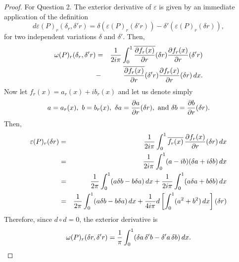 \begin{proof}
  For Question 2. The exterior derivative of
  $\varepsilon$ is given by an immediate application of the definition
  $$
    d\varepsilon(P)_r(\delta_r,\delta'r) = \delta(\varepsilon(P)_r(\delta'r)) - \delta'(\varepsilon(P)_r(\delta r)),
    $$
  for two independent variations $\delta$ and $\delta'$. Then,
  \begin{eqnarray*}
    \omega(P)_r(\delta_r,\delta'r) &= &{1 \over 2i\pi} \int_0^1 \overline{\partial f_r(x) \over \partial r}(\delta r)
    {\partial f_r(x) \over \partial r}(\delta' r) \\
    & - & \overline{\partial f_r(x) \over \partial r}(\delta' r)
    {\partial f_r(x) \over \partial r}(\delta r) \, dx.
  \end{eqnarray*}
  Now let $f_r(x) = a_r(x) + ib_r(x)$ and let us denote
  simply
  $$
    a = a_r(x),\ b = b_r(x),\ \delta a = {\partial a \over \partial r}(\delta r),\
    \mbox{and}\ \delta b = {\partial b \over \partial r}(\delta r).
    $$
  Then,
  \begin{eqnarray*}
    \varepsilon(P)_r(\delta r) & = & {1 \over 2i\pi} \int_0^1
    \overline{f_r(x)} \, {\partial f_r(x) \over \partial r}(\delta r) \, dx \\
    &=& {1 \over 2i\pi} \int_0^1
    (a -ib) (\delta a + i \delta b) \, dx \\
    &=& {1 \over 2\pi} \int_0^1 (a \delta b - b \delta a) \, dx + {1 \over 2i\pi} \int_0^1 (a \delta a + b \delta b) \, dx \\
    &=& {1 \over 2\pi} \int_0^1 (a \delta b - b \delta a) \, dx + {1 \over 4i\pi} d\left[\int_0^1 (a^2 + b^2) \, dx\right](\delta r)
  \end{eqnarray*}
  Therefore, since $d\circ d = 0$, the exterior derivative is
  $$
    \omega(P)_r(\delta r,\delta'r) = {1\over \pi}\int_0^1(\delta a\, \delta'b-\delta'a\, \delta b) \, dx.
    $$
  

\end{proof}
